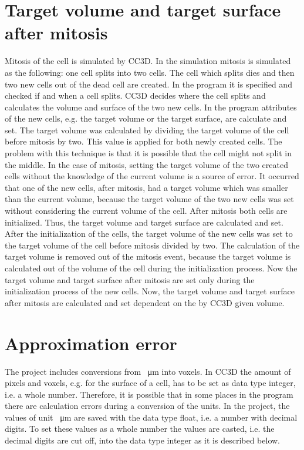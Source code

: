 \section{Target volume and target surface after mitosis} \label{sec:TargetVolumeSurfaceAfterMitosis}
Mitosis of the cell is simulated by \ac{CC3D}. In the simulation mitosis is simulated as the following: one cell splits into two cells. The cell which splits dies and then two new cells out of the dead cell are created. \newline
In the program it is specified and checked if and when a cell splits. \ac{CC3D} decides where the cell splits and calculates the volume and surface of the two new cells. In the program attributes of the new cells, e.g. the target volume or the target surface, are calculate and set. \newline 
The target volume was calculated by dividing the target volume of the cell before mitosis by two. This value is applied for both newly created cells. The problem with this technique is that it is possible that the cell might not split in the middle. In the case of mitosis, setting the target volume of the two created cells without the knowledge of the current volume is a source of error. It occurred that one of the new cells, after mitosis, had a target volume which was smaller than the current volume,  because the target volume of the two new cells was set without considering the current volume of the cell. \newline
After mitosis both cells are initialized. Thus, the target volume and target surface are calculated and set. After the initialization of the cells, the target volume of the new cells was set to the target volume of the cell before mitosis divided by two. \newline
The calculation of the target volume is removed out of the mitosis event, because the target volume is calculated out of the volume of the cell during the initialization process.  Now the target volume and target surface after mitosis are set only during the initialization process of the new cells. \newline
Now, the target volume and target surface after mitosis are calculated and set dependent on the by \ac{CC3D} given volume.


\section{Approximation error} \label{sec:ApproximationError}
The project includes conversions from \SI{}{\micro\metre} into voxels. In \ac{CC3D} the amount of pixels and voxels, e.g. for the surface of a cell, has to be set as data type integer, i.e. a whole number. Therefore, it is possible that in some places in the program there are calculation errors during a conversion of the units. In the project, the values of unit \SI{}{\micro\metre} are saved with the data type float, i.e. a number with decimal digits. To set these values as a whole number the values are casted, i.e. the decimal digits are cut off, into the data type integer as it is described below. 

